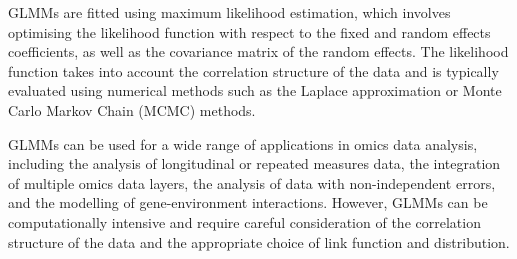 \documentclass[
]{book}
\begin{document}
GLMMs are fitted using maximum likelihood estimation, which involves optimising the likelihood function with respect to the fixed and random effects coefficients, as well as the covariance matrix of the random effects. The likelihood function takes into account the correlation structure of the data and is typically evaluated using numerical methods such as the Laplace approximation or Monte Carlo Markov Chain (MCMC) methods.

GLMMs can be used for a wide range of applications in omics data analysis, including the analysis of longitudinal or repeated measures data, the integration of multiple omics data layers, the analysis of data with non-independent errors, and the modelling of gene-environment interactions. However, GLMMs can be computationally intensive and require careful consideration of the correlation structure of the data and the appropriate choice of link function and distribution.

\small
\end{document}
